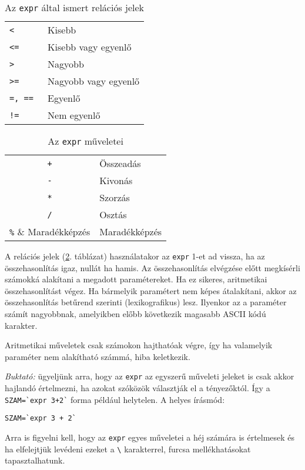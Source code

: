 \begin{table}[h!]
\centering\small
\begin{tabular}{|ll|}
\hline
\tt<	& Kisebb\\
\tt<=	& Kisebb vagy egyenlő\\
\tt> 	& Nagyobb\\
\tt>=	& Nagyobb vagy egyenlő\\
\tt=, ==	& Egyenlő\\
\tt!=	& Nem egyenlő\\
\hline
\end{tabular}
\caption{Az \texttt{expr} által ismert relációs jelek} \label{table:rel2}
\end{table}


\begin{table}[h!]
\centering\small
\begin{tabular}{|cl|}
\hline
\verb.+.	& Összeadás\\
\verb.-.	& Kivonás\\
\verb.*.	& Szorzás\\
\verb./.	& Osztás\\
\verb.%.	& Maradékképzés\\
\hline
\end{tabular}
\caption{Az \texttt{expr} műveletei} \label{table:rel}
\end{table}

A relációs jelek (\ref{table:rel}. táblázat) használatakor az \texttt{expr} 1-et ad vissza, ha az összehasonlítás igaz, nullát ha hamis. Az összehasonlítás elvégzése előtt megkísérli számokká alakítani a megadott paramétereket. Ha ez sikeres, aritmetikai összehasonlítást végez. Ha bármelyik paramétert nem képes átalakítani, akkor az összehasonlítás betűrend szerinti (lexikografikus) lesz. Ilyenkor az a paraméter számít nagyobbnak, amelyikben előbb következik magasabb ASCII kódú karakter.

Aritmetikai műveletek csak számokon hajthatóak végre, így ha valamelyik paraméter nem alakítható számmá, hiba keletkezik. 

\emph{Buktató:} ügyeljünk arra, hogy az \texttt{expr} az egyszerű műveleti jeleket is csak akkor hajlandó értelmezni, ha azokat szóközök választják el a tényezőktól. Így a 
\verb.SZAM=`expr 3+2`.
forma például helytelen. A helyes írásmód:
\begin{verbatim}
SZAM=`expr 3 + 2`
\end{verbatim}

Arra is figyelni kell, hogy az \texttt{expr} egyes műveletei a héj számára is értelmesek és ha elfelejtjük 
levédeni ezeket a \verb.\. karakterrel, furcsa mellékhatásokat tapasztalhatunk. 

